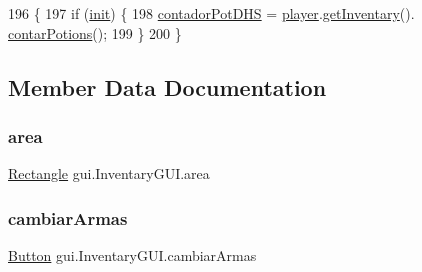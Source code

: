 \begin{DoxyCode}
196                                 \{
197         \textcolor{keywordflow}{if} (\mbox{\hyperlink{classgui_1_1_inventary_g_u_i_a49c7773a4aeb02c46640af69f5f10b15}{init}}) \{
198             \mbox{\hyperlink{classgui_1_1_inventary_g_u_i_a43c440436b74e888b47499677db277c6}{contadorPotDHS}} = \mbox{\hyperlink{classgui_1_1_inventary_g_u_i_ac788453bd94ba3fa6875e67fed92e1d7}{player}}.\mbox{\hyperlink{classentities_1_1_subject_a38fe8f9b3cc9f4c551163ae1f09f480b}{getInventary}}().
      \mbox{\hyperlink{classitems_1_1_inventary_a296224dd144bd2e6c11d7024d73767c3}{contarPotions}}();
199         \}
200     \}
\end{DoxyCode}


\subsection{Member Data Documentation}
\mbox{\label{classgui_1_1_inventary_g_u_i_a4668f71d7b4f5218cbd26bd81672f4a2}} 
\subsubsection{\texorpdfstring{area}{area}}
{\footnotesize\ttfamily \mbox{\hyperlink{classorg_1_1newdawn_1_1slick_1_1geom_1_1_rectangle}{Rectangle}} gui.\+Inventary\+G\+U\+I.\+area\hspace{0.3cm}{\ttfamily [private]}}

\mbox{\label{classgui_1_1_inventary_g_u_i_aea875536f310e3a9e31d6e31e7d74dfd}} 
\subsubsection{\texorpdfstring{cambiar\+Armas}{cambiarArmas}}
{\footnotesize\ttfamily \mbox{\hyperlink{classgui_1_1_button}{Button}} gui.\+Inventary\+G\+U\+I.\+cambiar\+Armas\hspace{0.3cm}{\ttfamily [private]}}

\mbox{\label{classgui_1_1_inventary_g_u_i_a43c440436b74e888b47499677db277c6}} 
